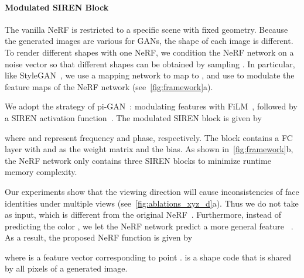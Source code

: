 \documentclass[10pt,twocolumn,letterpaper]{article}
\begin{document}
\paragraph{Modulated SIREN Block}
The vanilla NeRF is restricted to a specific scene with fixed geometry. Because the generated images are various for GANs, the shape of each image is different. To render different shapes with one NeRF, we condition the NeRF network on a noise vector  so that different shapes can be obtained by sampling  . In particular, like StyleGAN~\cite{karras2019StyleBased}, we use a mapping network  to map  to , and use  to modulate the feature maps of the NeRF network (see~\cref{fig:framework}a).

We adopt the strategy of pi-GAN~\cite{chan2021piGAN}: modulating features with FiLM~\cite{perez2017FiLM,48757}, followed by a SIREN activation function~\cite{sitzmann2020Implicita}. The modulated SIREN block is given by

where  and  represent frequency and phase, respectively. The block contains a FC layer with  and  as the weight matrix and the bias. As shown in~\cref{fig:framework}b, the NeRF network only contains three SIREN blocks to minimize runtime memory complexity.

Our experiments show that the viewing direction  will cause inconsistencies of face identities under multiple views (see~\cref{fig:ablations_xyz_d}a). Thus we do not take  as input, which is different from the original NeRF~\cite{mildenhall2020NeRF}. Furthermore, instead of predicting the color , we let the NeRF network predict a more general feature ~\cite{niemeyer2021GIRAFFE}. As a result, the proposed NeRF function is given by

where  is a feature vector corresponding to point .  is a shape code that is shared by all pixels of a generated image.
\end{document}
